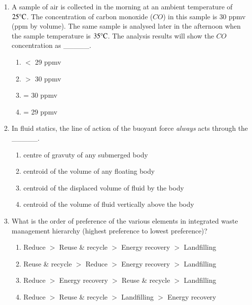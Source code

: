 \documentclass[journal]{IEEEtran}
\begin{document}
\begin{enumerate}[start=1]
\hfill{}
\begin{multicols}{4}
\begin{enumerate}
\item 58 \%
\item 86 \%
\item 87 \%
\item 90 \%
\end{enumerate}
\end{multicols}
\item A sample of air is collected in the morning at an ambient temperature of $25\celsius$. The concentration of carbon monoxide ($CO$) in this sample is 30 ppmv (ppm by volume). The same sample is analysed later in the afternoon when the sample temperature is $35\celsius$. The analysis results will show the $CO$ concentration as \_\_\_\_\_. 
\hfill{}
\begin{multicols}{4}
\begin{enumerate}
\item $<$ 29 ppmv
\item $>$ 30 ppmv
\item = 30 ppmv
\item = 29 ppmv

\end{enumerate}
\end{multicols}

\item In fluid statics, the line of action of the buoyant force \textit{always} acts through the \_\_\_\_\_.
\hfill{}
\begin{enumerate}
\item centre of gravuty of any submerged body
\item centroid of the volume of any floating body
\item centroid of the displaced volume of fluid by the body
\item centroid of the volume of fluid vertically above the body
\end{enumerate}

\item What is the order of preference of the various elements in integrated waste management hierarchy (highest preference to lowest preference)?
\hfill{}
\begin{enumerate}
\item Reduce $>$ Reuse \& recycle $>$ Energy recovery $>$ Landfilling
\item Reuse \& recycle $>$ Reduce $>$ Energy recovery $>$ Landfilling
\item Reduce $>$ Energy recovery $>$ Reuse \& recycle $>$ Landfilling
\item Reduce $>$ Reuse \& recycle $>$ Landfilling $>$ Energy recovery
\end{enumerate}


\end{enumerate}
\end{document}
